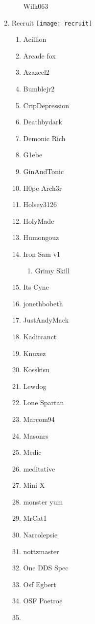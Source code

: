 \documentclass{article}
\begin{document}
\begin{enumerate}[I]
\begin{enumerate}[I]
	Wilk063
    \end{enumerate}
  \item
    Recruit \texttt{[image: recruit]}
    \begin{enumerate}[I]
      \item 
	Acillion
      \item
	Arcade fox
      \item
	Azazeel2
      \item
	Bumblejr2
      \item
	CripDepression
      \item
	Deathbydark
      \item
	Demonic Rich
      \item
	G1ebe
      \item
	GinAndTonic
      \item
	H0pe Arch3r
      \item
	Holsey3126
      \item
	HolyMade
      \item
	Humongouz
      \item
	Iron Sam v1
	  \begin{enumerate}[I]
	    \item
	      Grimy Skill
	  \end{enumerate}
      \item
	Its Cyne
      \item
	jonethbobeth
      \item
	JustAndyMack
      \item
	Kadircanct
      \item
	Knuxez
      \item
	Kosskisu
      \item
	Lewdog
      \item
	Lone Spartan
      \item
	Marcom94
      \item
	Masonrs
      \item
	Medic
      \item
	meditative
      \item
	Mini X
      \item
	monster yum
      \item
	MrCat1
      \item
	Narcolepsie
      \item
	nottzmaster
      \item
	One DDS Spec
      \item
	Osf Egbert
      \item
	OSF Poetroe
      \item

\end{enumerate}
\end{enumerate}
\end{document}

